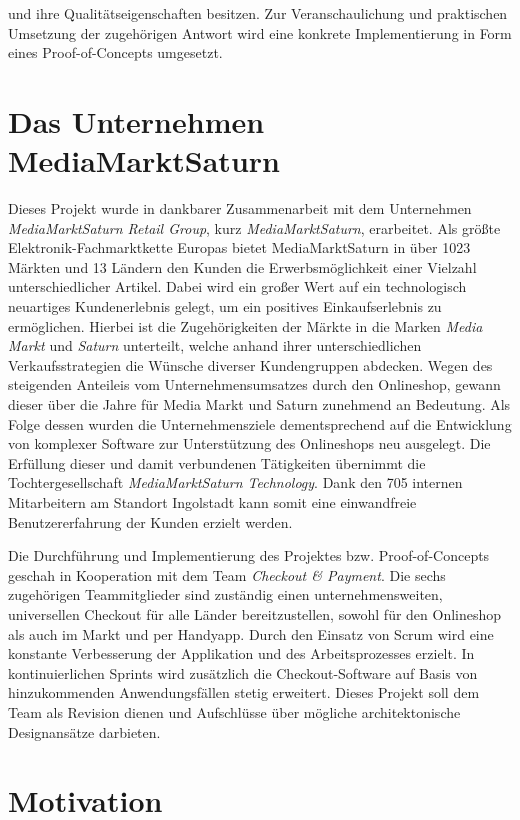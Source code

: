 und ihre Qualitätseigenschaften besitzen. Zur Veranschaulichung und praktischen Umsetzung der zugehörigen Antwort wird eine konkrete Implementierung in Form eines Proof-of-Concepts umgesetzt.

\section{Das Unternehmen MediaMarktSaturn}

Dieses Projekt wurde in dankbarer Zusammenarbeit mit dem Unternehmen \emph{MediaMarktSaturn Retail Group}, kurz \emph{MediaMarktSaturn}, erarbeitet. Als größte Elektronik-Fachmarktkette Europas bietet MediaMarktSaturn in über 1023 Märkten und 13 Ländern den Kunden die Erwerbsmöglichkeit einer Vielzahl unterschiedlicher Artikel. Dabei wird ein großer Wert auf ein technologisch neuartiges Kundenerlebnis gelegt, um ein positives Einkaufserlebnis zu ermöglichen. Hierbei ist die Zugehörigkeiten der Märkte in die Marken \emph{Media Markt} und \emph{Saturn} unterteilt, welche anhand ihrer unterschiedlichen Verkaufsstrategien die Wünsche diverser Kundengruppen abdecken. Wegen des steigenden Anteileis vom Unternehmensumsatzes durch den Onlineshop, gewann dieser über die Jahre für Media Markt und Saturn zunehmend an Bedeutung. Als Folge dessen wurden die Unternehmensziele dementsprechend auf die Entwicklung von komplexer Software zur Unterstützung des Onlineshops neu ausgelegt. Die Erfüllung dieser und damit verbundenen Tätigkeiten übernimmt die Tochtergesellschaft \emph{MediaMarktSaturn Technology}. Dank den 705 internen Mitarbeitern am Standort Ingolstadt kann somit eine einwandfreie Benutzererfahrung der Kunden erzielt werden.

Die Durchführung und Implementierung des Projektes bzw. Proof-of-Concepts geschah in Kooperation mit dem Team \emph{Checkout \& Payment}. Die sechs zugehörigen Teammitglieder sind zuständig einen unternehmensweiten, universellen Checkout für alle Länder bereitzustellen, sowohl für den Onlineshop als auch im Markt und per Handyapp. Durch den Einsatz von \Gls{Scrum} wird eine konstante Verbesserung der Applikation und des Arbeitsprozesses erzielt. In kontinuierlichen \Glspl{Sprint} wird zusätzlich die Checkout-Software auf Basis von hinzukommenden Anwendungsfällen stetig erweitert. Dieses Projekt soll dem Team als Revision dienen und Aufschlüsse über mögliche architektonische Designansätze darbieten.



\section{Motivation}

